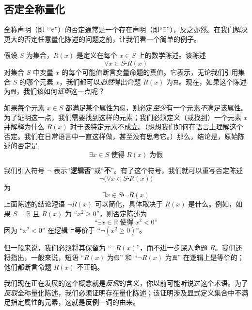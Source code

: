 \subsection{否定全称量化}

全称声明（即 ``$\forall$''）的否定通常是一个存在声明（即``$\exists$''），反之亦然。在我们解决更大的否定任意量化陈述的问题之前，让我们看一个简单的例子。

假设 $S$ 为集合，$R(x)$ 是定义在每个 $x \in S$ 上的数学陈述。该陈述
\[\forall x \in S \centerdot R(x)\]
对集合 $S$ 中变量 $x$ 的每个可能值断言变量命题的真值。它表示，无论我们引用集合 $S$ 的哪个元素 $x$，我们都可以\emph{必然}得出命题 $R(x)$ 为\verb|真|。现在，如果这个陈述为\verb|假|，我们该如何\emph{证明}这一点呢？

如果每个元素 $x \in S$ 都满足某个属性为\verb|假|，则必定\emph{至少}有一个元素\emph{不}满足该属性。为了证明这一点，我们需要找到这样的元素；我们必须定义（或找到）一个元素 $x$ 并解释为什么 $R(x)$ 对于该特定元素不成立。（想想我们如何在语言上理解这个否定。我们在日常语言中一直这样做，甚至没有思考它。）那么，结论是，原始陈述的否定是
\[\exists x \in S \;\text{使得}\; R(x) \;\text{为假}\]

我们引入符号 $\neg$ 表示``\textbf{逻辑否}''或``\textbf{不}''。有了这个符号，我们就可以重写否定陈述
\[\neg\big(\forall x \in S \centerdot R(x)\big)\]
为
\[\exists x \in S \centerdot \neg R(x)\]
上面陈述的结论短语 $\neg R(x)$ 可以简化，具体取决于 $R(x)$ 是什么。例如，如果 $S = \mathbb{R}$ 且 $R(x)$ 为 ``$x^2 \ge 0$''，则否定陈述为
\[\text{``}\exists x \in \mathbb{R} \;\text{使得}\; x^2 < 0 \text{''}\]
因为 ``$x^2 < 0$'' 在逻辑上等价于 ``$\neg(x^2 \ge 0)$''。

但一般来说，我们必须将其保留为 ``$\neg R(x)$''，而不进一步深入命题 $R$。我们还将指出，一般来说，短语 ``$R(x)$ 为\verb|假|'' 和 ``$\neg R(x)$ 为\verb|真|'' 在逻辑上是等价的；他们都断言命题 $R(x)$ 不正确。

我们现在正在发展的这个概念就是\emph{反例}的含义，你以前可能听说过这个术语。为了\emph{反驳}全称量化陈述，我们必须证明存在量化陈述；该证明涉及显式定义集合中不满足指定属性的元素，这就是\textbf{反例}一词的由来。
